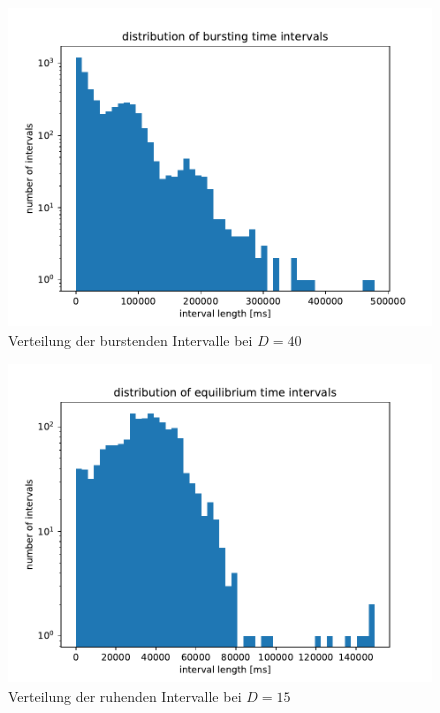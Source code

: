 \documentclass[12pt,a4paper]{article}
\begin{document}
\begin{figure}[H]
	\centering
	\includegraphics[scale=1]{bdistajrj2realrinzelpoi26n14003.pdf}\caption{Verteilung der burstenden Intervalle bei $D=40$}
	\label{b4003}
\end{figure}
\begin{figure}[H]
	\centering
	\includegraphics[scale=1]{eqdistajrj2realrinzelpoi26n11501.pdf}\caption{Verteilung der ruhenden Intervalle bei $D=15$}
	\label{eq1501}
\end{figure}
\end{document}
